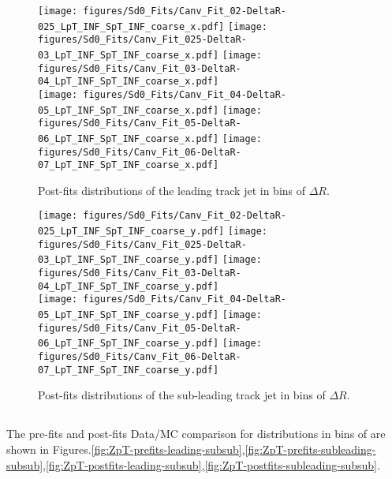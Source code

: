 \begin{figure}[htbp]
  \centering
 \texttt{[image: figures/Sd0\_Fits/Canv\_Fit\_02-DeltaR-025\_LpT\_INF\_SpT\_INF\_coarse\_x.pdf]}
 \texttt{[image: figures/Sd0\_Fits/Canv\_Fit\_025-DeltaR-03\_LpT\_INF\_SpT\_INF\_coarse\_x.pdf]}
 \texttt{[image: figures/Sd0\_Fits/Canv\_Fit\_03-DeltaR-04\_LpT\_INF\_SpT\_INF\_coarse\_x.pdf]}\\
 \texttt{[image: figures/Sd0\_Fits/Canv\_Fit\_04-DeltaR-05\_LpT\_INF\_SpT\_INF\_coarse\_x.pdf]}
 \texttt{[image: figures/Sd0\_Fits/Canv\_Fit\_05-DeltaR-06\_LpT\_INF\_SpT\_INF\_coarse\_x.pdf]}
 \texttt{[image: figures/Sd0\_Fits/Canv\_Fit\_06-DeltaR-07\_LpT\_INF\_SpT\_INF\_coarse\_x.pdf]}\\


\caption{Post-fits \sdzero distributions of the leading track jet in bins of $\Delta R$. }
  \label{fig:dR-postfits-leading-subsub}
\end{figure}


\begin{figure}[htbp]
  \centering
 \texttt{[image: figures/Sd0\_Fits/Canv\_Fit\_02-DeltaR-025\_LpT\_INF\_SpT\_INF\_coarse\_y.pdf]}
 \texttt{[image: figures/Sd0\_Fits/Canv\_Fit\_025-DeltaR-03\_LpT\_INF\_SpT\_INF\_coarse\_y.pdf]}
 \texttt{[image: figures/Sd0\_Fits/Canv\_Fit\_03-DeltaR-04\_LpT\_INF\_SpT\_INF\_coarse\_y.pdf]}\\
 \texttt{[image: figures/Sd0\_Fits/Canv\_Fit\_04-DeltaR-05\_LpT\_INF\_SpT\_INF\_coarse\_y.pdf]}
 \texttt{[image: figures/Sd0\_Fits/Canv\_Fit\_05-DeltaR-06\_LpT\_INF\_SpT\_INF\_coarse\_y.pdf]}
 \texttt{[image: figures/Sd0\_Fits/Canv\_Fit\_06-DeltaR-07\_LpT\_INF\_SpT\_INF\_coarse\_y.pdf]}\\

\caption{Post-fits \sdzero distributions of the sub-leading track jet in bins of $\Delta R$. }
  \label{fig:dR-postfits-subleading-subsub}
\end{figure}


\clearpage
\subsection{\zpt}

The pre-fits and post-fits Data/MC comparison for \sdzero distributions in bins of \zpt are shown in Figures.\ref{fig:ZpT-prefits-leading-subsub},\ref{fig:ZpT-prefits-subleading-subsub},\ref{fig:ZpT-postfits-leading-subsub},\ref{fig:ZpT-postfits-subleading-subsub}.

